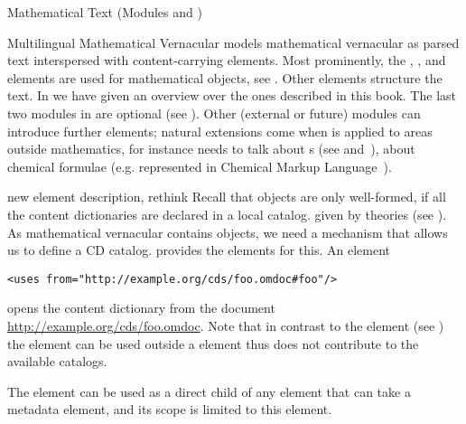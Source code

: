 \begin{tchapter}[id=mtxt,short=Mathematical Text]{Mathematical Text (Modules
   and )}
\begin{tsection}[id=mtext]{Multilingual Mathematical Vernacular}
  \omdoc models mathematical vernacular as parsed text interspersed with content-carrying
  elements. Most prominently, the , ,
  and  elements are used for mathematical objects, see
  . Other elements structure the text. In  we have
  given an overview over the ones described in this book. The last two modules in
   are optional (see ).  Other (external or
  future) \omdoc modules can introduce further elements; natural extensions come when
  \omdoc is applied to areas outside mathematics, for instance  needs to talk about s (see
   and~\cite{Kohlhase:codemlspec}), 
  about chemical formulae (e.g. represented in Chemical Markup
  Language~\cite{CML:online}).

  \begin{newpart}{new element description, rethink}
    Recall that \openmath objects are only well-formed, if all the content dictionaries
    are declared in a local catalog. given by \omdoc theories (see ). As mathematical
    vernacular contains \openmath objects, we need a mechanism that allows us to define a
    CD catalog. \omdoc provides the  elements for this. An element
\begin{lstlisting}[label=lst:uses,
  caption={Opening a CD Catalog},
  index={uses}]
<uses from="http://example.org/cds/foo.omdoc#foo"/>
\end{lstlisting}
opens the \omdoc content dictionary  from the \omdoc document
\url{http://example.org/cds/foo.omdoc}. Note that in contrast to the 
element (see ) the  element can be used outside a
 element thus does not contribute to the available catalogs.

The  element can be used as a direct child of any \omdoc element that can
take a metadata element, and its scope is limited to this element.
\end{newpart}


\end{tsection}
\end{tchapter}
